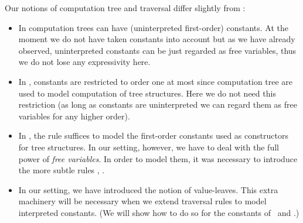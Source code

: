 \begin{remark}
Our notions of computation tree and traversal differ slightly from \cite{OngLics2006}:
\begin{itemize}[-]
    \item In \cite{OngLics2006} computation trees can have (uninterpreted first-order) constants. At the moment we do not have taken constants into account but as we have already observed, uninterpreted constants can be just regarded as free variables, thus we do not lose any expressivity here.

    \item In \cite{OngLics2006}, constants are restricted to order one at most since computation tree
    are used to model computation of tree structures. Here we do not need this restriction (as long as constants are uninterpreted we can regard them as free variables for any higher order).


    \item In \cite{OngLics2006}, the rule  suffices to model the first-order constants used as constructors for tree structures. In our setting, however, we have to deal with the full power of \emph{free variables}.
        In order to model them, it was necessary to introduce the more subtle rules , .

    \item In our setting, we have introduced the notion of value-leaves. This extra machinery will be necessary when we extend traversal rules to model interpreted constants. (We will show how to do so for the constants of \pcf\ and \ialgol.)
    \end{itemize}
\end{remark}

